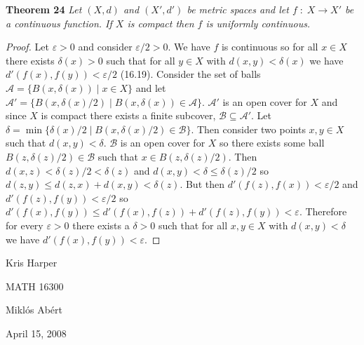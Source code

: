 \documentclass{article}
\begin{document}
\begin{flushleft}
\textbf{Theorem 24}
\textsl{Let $(X,d)$ and $(X',d')$ be metric spaces and let $f \; : \; X \rightarrow X'$ be a continuous function. If $X$ is compact then $f$ is uniformly continuous.}
\begin{proof}
Let $\varepsilon > 0$ and consider $\varepsilon/2 > 0$. We have $f$ is continuous so for all $x \in X$ there exists $\delta (x) > 0$ such that for all $y \in X$ with $d(x,y) < \delta (x)$ we have $d'(f(x),f(y)) < \varepsilon/2$ (16.19). Consider the set of balls $\mathcal{A} = \{B(x, \delta (x)) \mid x\in X\}$ and let $\mathcal{A}' = \{B(x, \delta(x)/2) \mid B(x, \delta(x)) \in \mathcal{A}\}$. $\mathcal{A}'$ is an open cover for $X$ and since $X$ is compact there exists a finite subcover, $\mathcal{B} \subseteq \mathcal{A}'$. Let $\delta = \min \{\delta(x)/2 \mid B(x, \delta(x)/2) \in \mathcal{B} \}$. Then consider two points $x,y \in X$ such that $d(x,y) < \delta$. $\mathcal{B}$ is an open cover for $X$ so there exists some ball $B(z, \delta(z)/2) \in \mathcal{B}$ such that $x \in B(z, \delta(z)/2)$. Then $d(x,z) < \delta(z)/2 < \delta(z)$ and $d(x,y) < \delta \leq \delta(z)/2$ so $d(z,y) \leq d(z,x) + d(x,y) < \delta(z)$. But then $d'(f(z),f(x)) < \varepsilon/2$ and $d'(f(z),f(y)) < \varepsilon/2$ so $d'(f(x),f(y)) \leq d'(f(x),f(z)) + d'(f(z),f(y)) < \varepsilon$. Therefore for every $\varepsilon > 0$ there exists a $\delta > 0$ such that for all $x,y \in X$ with $d(x,y) < \delta$ we have $d'(f(x),f(y)) < \varepsilon$.
\end{proof}

\end{flushleft}

\newpage

\begin{flushright}
Kris Harper

MATH 16300

Mikl\'{o}s Ab\'{e}rt

April 15, 2008
\end{flushright}
\end{document}
